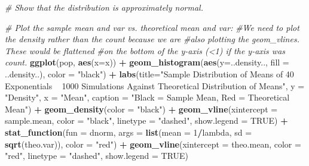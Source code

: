 \documentclass[]{article}
\newenvironment{Shaded}{\begin{snugshade}}{\end{snugshade}}
\newcommand{\KeywordTok}[1]{\textcolor[rgb]{0.13,0.29,0.53}{\textbf{#1}}}
\newcommand{\DataTypeTok}[1]{\textcolor[rgb]{0.13,0.29,0.53}{#1}}
\newcommand{\DecValTok}[1]{\textcolor[rgb]{0.00,0.00,0.81}{#1}}
\newcommand{\StringTok}[1]{\textcolor[rgb]{0.31,0.60,0.02}{#1}}
\newcommand{\CommentTok}[1]{\textcolor[rgb]{0.56,0.35,0.01}{\textit{#1}}}
\newcommand{\OtherTok}[1]{\textcolor[rgb]{0.56,0.35,0.01}{#1}}
\newcommand{\OperatorTok}[1]{\textcolor[rgb]{0.81,0.36,0.00}{\textbf{#1}}}
\newcommand{\NormalTok}[1]{#1}
\begin{document}
\begin{Shaded}
\begin{Highlighting}[]
\CommentTok{# Show that the distribution is approximately normal.}
        
         \CommentTok{# Plot the sample mean and var vs. theoretical mean and var:}
        \CommentTok{#We need to plot the density rather than the count because we are }
        \CommentTok{#also plotting the geom_vlines. These would be flattened }
        \CommentTok{#on the bottom of the y-axis (<1) if the y-axis was count.}
        \KeywordTok{ggplot}\NormalTok{(pop, }\KeywordTok{aes}\NormalTok{(}\DataTypeTok{x=}\NormalTok{x)) }\OperatorTok{+}
\StringTok{                }\KeywordTok{geom_histogram}\NormalTok{(}\KeywordTok{aes}\NormalTok{(}\DataTypeTok{y=}\NormalTok{..density.., }\DataTypeTok{fill =}\NormalTok{ ..density..), }
                               \DataTypeTok{color =} \StringTok{"black"}\NormalTok{) }\OperatorTok{+}
\StringTok{                }\KeywordTok{labs}\NormalTok{(}\DataTypeTok{title=}\StringTok{"Sample Distribution of Means of 40 Exponentials ~ 1000 Simulations Against Theoretical Distribution of Means"}\NormalTok{, }
                     \DataTypeTok{y =} \StringTok{"Density"}\NormalTok{, }
                     \DataTypeTok{x =} \StringTok{"Mean"}\NormalTok{, }
                     \DataTypeTok{caption =} \StringTok{"Black = Sample Mean, Red = Theoretical Mean"}\NormalTok{) }\OperatorTok{+}
\StringTok{                }\KeywordTok{geom_density}\NormalTok{(}\DataTypeTok{color =} \StringTok{"black"}\NormalTok{) }\OperatorTok{+}
\StringTok{                }\KeywordTok{geom_vline}\NormalTok{(}\DataTypeTok{xintercept =}\NormalTok{ sample.mean, }\DataTypeTok{color =} \StringTok{"black"}\NormalTok{, }\DataTypeTok{linetype =} \StringTok{"dashed"}\NormalTok{, }\DataTypeTok{show.legend =} \OtherTok{TRUE}\NormalTok{) }\OperatorTok{+}
\StringTok{                }\KeywordTok{stat_function}\NormalTok{(}\DataTypeTok{fun =}\NormalTok{ dnorm, }\DataTypeTok{args =} \KeywordTok{list}\NormalTok{(}\DataTypeTok{mean =} \DecValTok{1}\OperatorTok{/}\NormalTok{lambda, }\DataTypeTok{sd =} \KeywordTok{sqrt}\NormalTok{(theo.var)), }
                              \DataTypeTok{color =} \StringTok{"red"}\NormalTok{) }\OperatorTok{+}
\StringTok{                }\KeywordTok{geom_vline}\NormalTok{(}\DataTypeTok{xintercept =}\NormalTok{ theo.mean, }\DataTypeTok{color =} \StringTok{"red"}\NormalTok{, }\DataTypeTok{linetype =} \StringTok{"dashed"}\NormalTok{, }\DataTypeTok{show.legend =} \OtherTok{TRUE}\NormalTok{)}
\end{Highlighting}
\end{Shaded}
\end{document}
